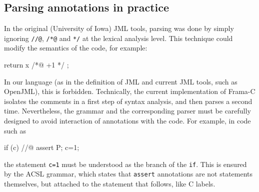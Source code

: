 \subsection{Parsing annotations in practice}

In the original (University of Iowa) JML tools, parsing was done by simply ignoring \verb|//@|, \verb|/*@| and
\verb|*/| at the lexical analysis level. This technique could modify the
semantics of the code, for example:
\begin{listing}{1}
return x /*@ +1 */ ;
\end{listing}
In our language (as in the definition of JML and current JML tools, such as OpenJML), this is forbidden. Technically, the current
implementation of Frama-C isolates the comments in a first step of
syntax analysis, and then parses a second time. Nevertheless, the
grammar and the corresponding parser must be carefully designed to
avoid interaction of annotations with the code. For example, in code such as
\begin{listing}{1}
  if (c) //@ assert P;
     c=1;
\end{listing}
the statement \lstinline|c=1| must be understood as the
branch of the \texttt{if}. This is ensured by the ACSL grammar,
which states that \lstinline|assert| annotations are not statements themselves,
but attached to the statement that follows, like C labels.
